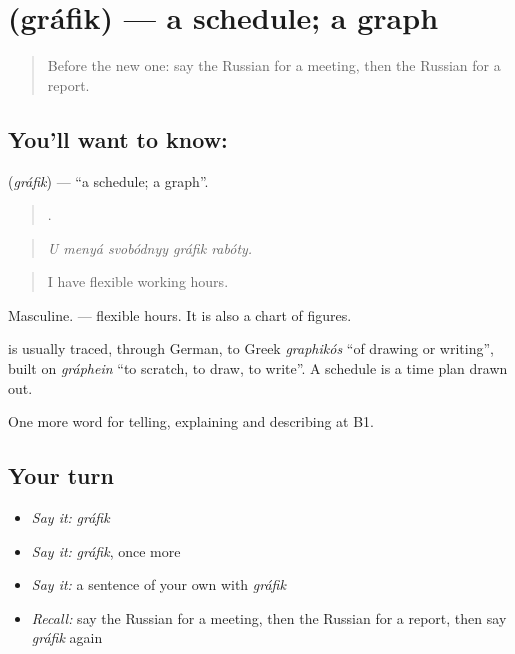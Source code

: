 \section[\texorpdfstring{\ru{график} (gráfik)}{график (gráfik)}]{ (gráfik) — a schedule; a graph}

\label{lesson:RU-C360-grafik}



\begin{quote}
Before the new one: say the Russian for a meeting, then the Russian for a report.
\end{quote}

\subsection*{You'll want to know: }
\textbf{} (\emph{gráfik}) — \textquotedblleft{}a schedule; a graph\textquotedblright{}.

\begin{quote}
    .
\end{quote}

\begin{quote}
\emph{U menyá svobódnyy gráfik rabóty.}
\end{quote}

\begin{quote}
I have flexible working hours.
\end{quote}

Masculine. \emph{ } — flexible hours. It is also a chart of figures.

\begin{cousinweb}
\textbf{} is usually traced, through German, to Greek \emph{graphikós} \textquotedblleft{}of drawing or writing\textquotedblright{}, built on \emph{gráphein} \textquotedblleft{}to scratch, to draw, to write\textquotedblright{}. A schedule is a time plan drawn out.
\end{cousinweb}

\begin{grammarlens}[title={What you've built}]
One more word for telling, explaining and describing at B1.
\end{grammarlens}

\subsection*{Your turn}
\begin{itemize}
\raggedright
  \item \emph{Say it:} \emph{gráfik}
  \item \emph{Say it:} \emph{gráfik}, once more
  \item \emph{Say it:} a sentence of your own with \emph{gráfik}
  \item \emph{Recall:} say the Russian for a meeting, then the Russian for a report, then say \emph{gráfik} again
\end{itemize}

